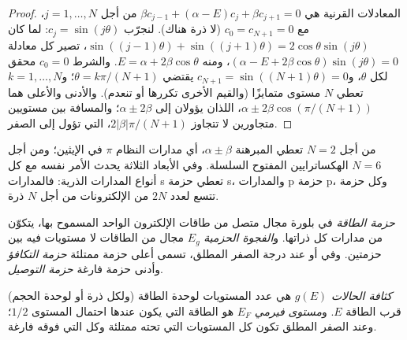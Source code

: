 \begin{proof}
المعادلات القرنية هي $\beta c_{j-1} + (\alpha - E)c_j + \beta c_{j+1} = 0$ من أجل $j = 1, \dots, N$، مع $c_0 = c_{N+1} = 0$
(لا ذرة هناك). لنجرّب $c_j = \sin(j\theta)$: لما كان $\sin((j - 1)\theta) + \sin((j + 1)\theta) = 2\cos\theta\sin(j\theta)$، تصير كل
معادلة $(\alpha - E + 2\beta\cos\theta)\sin(j\theta) = 0$، ومنه $E = \alpha + 2\beta\cos\theta$. والشرط $c_0 = 0$ محقق
لكل $\theta$، و$c_{N+1} = \sin((N + 1)\theta) = 0$ يقتضي $\theta = k\pi/(N + 1)$؛ و$k = 1, \dots, N$ تعطي $N$ مستوى
متمايزًا (والقيم الأخرى تكررها أو تنعدم). والأدنى والأعلى هما
$\alpha \pm 2\beta\cos(\pi/(N + 1))$، اللذان يؤولان إلى $\alpha \pm 2\beta$؛ والمسافة بين مستويين متجاورين لا تتجاوز
$2|\beta|\pi/(N + 1)$، التي تؤول إلى الصفر.
\end{proof}

من أجل $N = 2$ تعطي المبرهنة $\alpha \pm \beta$، أي مدارات النظام $\pi$ في الإيثين؛ ومن أجل
$N = 6$ الهكساترايين المفتوح السلسلة. وفي الأبعاد الثلاثة يحدث الأمر نفسه مع
كل أنواع المدارات الذرية: فالمدارات s تعطي حزمة s، والمدارات p حزمة p،
وكل حزمة تتسع لعدد $2N$ من الإلكترونات من أجل $N$ ذرة.

\begin{definition}[الحزم]\label{def:b3:solid-state:band}
\emph{حزمة الطاقة} في بلورة مجال متصل من
طاقات الإلكترون الواحد المسموح بها، يتكوّن من مدارات كل ذراتها. 
و\emph{الفجوة الحزمية} $E_g$ مجال من الطاقات لا مستويات فيه بين
حزمتين. وفي  أو  عند درجة الصفر المطلق، تسمى أعلى
حزمة ممتلئة \emph{حزمة التكافؤ} وأدنى حزمة فارغة
\emph{حزمة التوصيل}.
\end{definition}

\begin{definition}\label{def:b3:solid-state:fermi}
\emph{كثافة الحالات} $g(E)$ هي عدد
المستويات لوحدة الطاقة (ولكل ذرة أو لوحدة الحجم) قرب الطاقة $E$.
و\emph{مستوى فيرمي} $E_F$ هو الطاقة التي يكون عندها
احتمال  المستوى $1/2$؛ وعند الصفر المطلق تكون كل المستويات التي تحته
ممتلئة وكل التي فوقه فارغة.
\end{definition}

